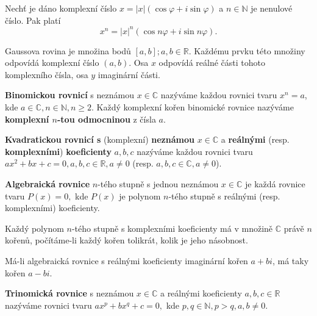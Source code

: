 \begin{veta}[Moivreova]
    Nechť je dáno komplexní číslo $x=|x|(\cos \varphi + i \sin \varphi)$ a $n\in \mathbb N$
    je nenulové číslo. Pak platí
    $$x^n = |x|^n (\cos n\varphi + i \sin n \varphi).$$
\end{veta}

\begin{pozn}
    Gaussova rovina je množina bodů $[a,b]; a,b \in \mathbb R$.
    Každému prvku této množiny odpovídá komplexní číslo $(a,b).$ Osa $x$ odpovídá
    reálné části tohoto komplexního čísla, osa $y$ imaginární části.
\end{pozn}

\begin{definition}
\textbf{Binomickou rovnicí} s neznámou $x\in \mathbb C$ nazýváme každou rovnici
tvaru $x^n=a$, kde $a\in \mathbb C,n\in \mathbb N, n\geq 2.$ Každý komplexní
kořen binomické rovnice nazýváme \textbf{komplexní $n$-tou odmocninou} z čísla $a.$
\end{definition}

\begin{definition}
\textbf{Kvadratickou rovnicí s} (komplexní) \textbf{neznámou} $x\in \mathbb C$ a
\textbf{reálnými} (resp. \textbf{komplexními}) \textbf{koeficienty} $a,b,c$
nazýváme každou rovnici tvaru
$ax^2+bx+c=0,a,b,c\in \mathbb R,a\ne0$ (resp. $a,b,c \in \mathbb C,a\ne 0$).
\end{definition}

\begin{definition}
\textbf{Algebraická rovnice} $n$-tého stupně s jednou neznámou $x\in \mathbb C$ je každá
rovnice tvaru $P(x)=0,$ kde $P(x)$ je polynom $n$-tého stupně s reálnými (resp.
komplexními) koeficienty.
\end{definition}

\begin{veta}
    Každý polynom $n$-tého stupně s komplexními koeficienty má v množině $\mathbb C$
    právě $n$ kořenů, počítáme-li každý kořen tolikrát, kolik je jeho násobnost.
\end{veta}

\begin{veta}
    Má-li algebraická rovnice s reálnými koeficienty imaginární kořen
    $a+bi$, má taky kořen $a-bi.$
\end{veta}

\begin{definition}
\textbf{Trinomická rovnice} s neznámou $x\in \mathbb C$ a reálnými koeficienty $a,b,c \in \mathbb R$
nazýváme rovnici tvaru $ax^p + bx^q + c = 0,$ kde $p,q\in \mathbb N, p>q, a,b\ne 0.$
\end{definition}
